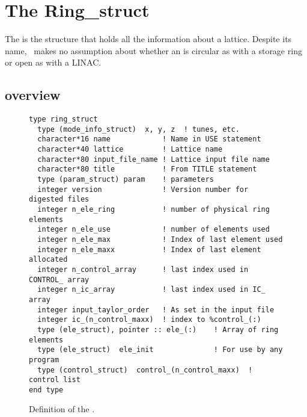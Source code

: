 \chapter{The Ring\_struct}


The  is the structure that holds all the information 
about a lattice.   Despite its name, \bmad\
makes no assumption about whether an  is circular as
with a storage ring or open as with a LINAC.

\section{overview}

\begin{figure}[tb]
\centering
\begin{verbatim}
type ring_struct
  type (mode_info_struct)  x, y, z  ! tunes, etc.
  character*16 name            ! Name in USE statement
  character*40 lattice         ! Lattice name
  character*80 input_file_name ! Lattice input file name
  character*80 title           ! From TITLE statement
  type (param_struct) param    ! parameters
  integer version              ! Version number for digested files
  integer n_ele_ring           ! number of physical ring elements
  integer n_ele_use            ! number of elements used
  integer n_ele_max            ! Index of last element used
  integer n_ele_maxx           ! Index of last element allocated
  integer n_control_array      ! last index used in CONTROL_ array
  integer n_ic_array           ! last index used in IC_ array
  integer input_taylor_order   ! As set in the input file
  integer ic_(n_control_maxx)  ! index to %control_(:)
  type (ele_struct), pointer :: ele_(:)    ! Array of ring elements
  type (ele_struct)  ele_init              ! For use by any program
  type (control_struct)  control_(n_control_maxx)  ! control list
end type
\end{verbatim}
\caption{Definition of the .}
\label{f:ring_struct}
\end{figure}

